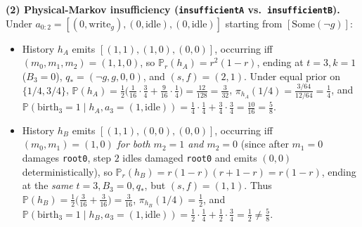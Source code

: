 \documentclass[11pt,a4paper]{article}
\providecommand{\tightlist}{\setlength{\itemsep}{2pt}\setlength{\parskip}{0pt}}
\begin{document}
\textbf{(2) Physical-Markov insufficiency (\texttt{insufficientA}
vs.~\texttt{insufficientB}).} Under
\(a_{0:2} = [(0,\mathrm{write}_g), (0,\mathrm{idle}), (0,\mathrm{idle})]\)
starting from \([\mathrm{Some}(\neg g)]\):

\begin{itemize}
\tightlist
\item
  History \(h_A\) emits \([(1,1), (1,0), (0,0)]\), occurring iff
  \((m_0, m_1, m_2) = (1, 1, 0)\), so \(\mathbb{P}_r(h_A) = r^2(1-r)\),
  ending at \(t=3, k=1\) (\(B_3 = 0\)), \(q_* = (\neg g, g, 0, 0)\), and
  \((s,f) = (2,1)\). Under equal prior on \(\{1/4, 3/4\}\),
  \(\mathbb{P}(h_A) = \frac{1}{2}\bigl(\frac{1}{16}\cdot\frac{3}{4} + \frac{9}{16}\cdot\frac{1}{4}\bigr) = \frac{12}{128} = \frac{3}{32}\),
  \(\pi_{h_A}(1/4) = \frac{3/64}{12/64} = \frac{1}{4}\), and
  \(\mathbb{P}(\mathrm{birth}_3 = 1 \mid h_A, a_3 = (1,\mathrm{idle})) = \frac{1}{4}\cdot\frac{1}{4} + \frac{3}{4}\cdot\frac{3}{4} = \frac{10}{16} = \frac{5}{8}\).
\item
  History \(h_B\) emits \([(1,1), (0,0), (0,0)]\), occurring iff
  \((m_0, m_1) = (1, 0)\) \emph{for both \(m_2 = 1\) and \(m_2 = 0\)}
  (since after \(m_1 = 0\) damages \texttt{root0}, step \(2\) idles
  damaged \texttt{root0} and emits \((0,0)\) deterministically), so
  \(\mathbb{P}_r(h_B) = r(1-r)(r + 1 - r) = r(1-r)\), ending at the
  \emph{same} \(t=3, B_3=0, q_*\), but \((s,f) = (1,1)\). Thus
  \(\mathbb{P}(h_B) = \frac{1}{2}\bigl(\frac{3}{16} + \frac{3}{16}\bigr) = \frac{3}{16}\),
  \(\pi_{h_B}(1/4) = \frac{1}{2}\), and
  \(\mathbb{P}(\mathrm{birth}_3 = 1 \mid h_B, a_3 = (1,\mathrm{idle})) = \frac{1}{2}\cdot\frac{1}{4} + \frac{1}{2}\cdot\frac{3}{4} = \frac{1}{2} \neq \frac{5}{8}\).
\end{itemize}
\end{document}

